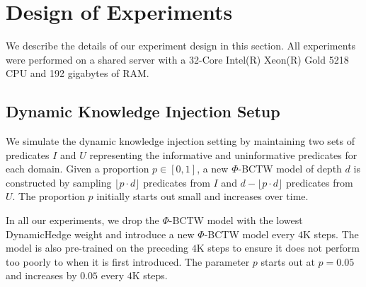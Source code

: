 \section{Design of Experiments}
\label{appendix:design_of_experiments}
We describe the details of our experiment design in this section. 
All experiments were performed on a shared server with a 32-Core Intel(R) Xeon(R) Gold 5218 CPU and 192 gigabytes of RAM.


\subsection{Dynamic Knowledge Injection Setup}
We simulate the dynamic knowledge injection setting by maintaining two sets of predicates $I$ and $U$ representing the informative and uninformative predicates for each domain. Given a proportion $p \in [0, 1]$, a new $\Phi$-BCTW model of depth $d$ is constructed by sampling $\lfloor p \cdot d \rfloor$ predicates from $I$ and $d - \lfloor p \cdot d \rfloor$ predicates from $U$. The proportion $p$ initially starts out small and increases over time.

In all our experiments, we drop the $\Phi$-BCTW model with the lowest DynamicHedge weight and introduce a new $\Phi$-BCTW model every $4$K steps. The model is also pre-trained on the preceding $4$K steps to ensure it does not perform too poorly to when it is first introduced. The parameter $p$ starts out at $p = 0.05$ and increases by $0.05$ every $4$K steps. 

\iffalse
    \begin{itemize}
        \item Let $U$ and $I$ denote the set of uninformative and informative predicates.
        \item Given $p \in [0, 1]$ and the depth parameter $d$ of a $\Phi$-BCTW model, return a set of $d$ predicates where $\lfloor p \cdot d \rfloor$ are sampled from $I$ and $d - \lfloor p \cdot d \rfloor$ are sampled from $U$.
        \item Every 4k steps, we introduce a new $\Phi$-BCTW model generated using a predicate step generated this way. This model is pre-trained on the preceding 4k steps before it is sent to the agent. This ensures that it does not perform too poorly to start. 
        \item The parameter $p$ is increased by $0.05$ (until a max of 1) every time a new model is introduced. 
    \end{itemize}
\fi




